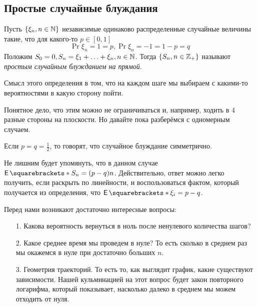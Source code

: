 \begin{example}
\begin{center}
\end{center}
\end{example}

\subsection{Простые случайные блуждания}

\begin{definition}
  Пусть $\{\xi_n, n \in \mathbb{N}\}$ независимые одинаково распределенные случайные
  величины такие, что для какого-то $p \in [0, 1]$
  \[
    \Pr{\xi_n = 1} = p, \Pr{\xi_n = -1} = 1 - p = q
  \]
  Положим $S_0 = 0, S_n = \xi_1 + \ldots + \xi_n,
  n \in \mathbb{N}$. Тогда $\{S_n, n \in \mathbb{Z}_{+}\}$ называют \emph{простым случайным
  блужданием на прямой}.
\end{definition}

Смысл этого определения в том, что на каждом шаге мы выбираем с какими-то вероятностями в какую сторону пойти.

Понятное дело, что этим можно не ограничиваться и, например, ходить в 4 разные
стороны на плоскости. Но давайте пока разберёмся с одномерным случаем.

\begin{definition}
  Если $p = q = \frac{1}{2}$, то говорят, что случайное блуждание симметрично.
\end{definition}

\begin{remark}
  Не лишним будет упомянуть, что в данном случае $\E{S_n} = (p - q)n$. 
  Действительно, ответ можно легко получить, если раскрыть по линейности, и воспользоваться
  фактом, который получается из определения, что $\E{\xi_i} = p - q$.
\end{remark}

Перед нами возникают достаточно интересные вопросы:

\begin{itemize}
  \item[1.] Какова вероятность вернуться в ноль после ненулевого количества шагов?
  \item[2.] Какое среднее время мы проведем в нуле? 
  То есть сколько в среднем раз мы окажемся в нуле при достаточно больших $n$.
  \item[3.] Геометрия траекторий. То есть то, как выглядит график, какие существуют зависимости.
  Нашей кульминацией на этот вопрос будет закон повторного логарифма, который показывает,
  насколько далеко в среднем мы можем отходить от нуля.
\end{itemize}


